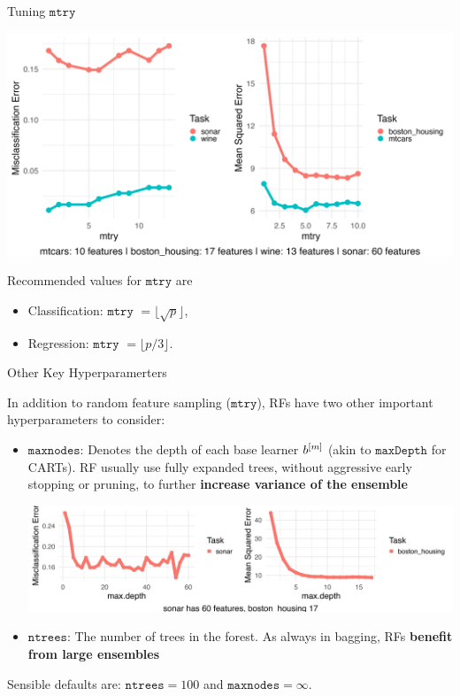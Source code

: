 \documentclass[11pt,compress,t,notes=noshow, xcolor=table]{beamer}
\begin{document}
\begin{vbframe}{Tuning $\texttt{mtry}$}

\begin{center}
\includegraphics[width=1\textwidth]{figure/forest-mtry.png}
\end{center}

Recommended values for $\texttt{mtry}$ are

\begin{itemize}
  \item Classification: $\texttt{mtry}$ $ = \lfloor \sqrt{p} \rfloor$,
  \item Regression: $\texttt{mtry}$ $ = \lfloor p/3 \rfloor$.
\end{itemize}

\end{vbframe}

\begin{vbframe}{Other Key Hyperparamerters}

In addition to random feature sampling ($\texttt{mtry}$), RFs have two other important hyperparameters to consider:

\begin{itemize}
  \item $\texttt{maxnodes}$: Denotes the depth of each base learner $b^{[m]}$ (akin to $\texttt{maxDepth}$ for CARTs). RF usually use fully expanded trees, without aggressive early stopping or pruning, to further \textbf{increase variance of the ensemble} 
\begin{center}
\includegraphics[width=1\textwidth]{figure/forest-maxdepth.png}
\end{center}
  \item $\texttt{ntrees}$: The number of trees in the forest. As always in bagging, RFs \textbf{benefit from large ensembles} 
\end{itemize}

Sensible defaults are: $\texttt{ntrees} = 100$ and $\texttt{maxnodes} = \infty$.

\end{vbframe}
\end{document}

